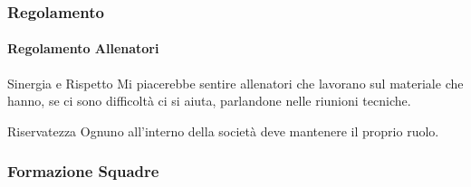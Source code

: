 \documentclass{beamer}
\begin{document}
\begin{frame}
\frametitle{Regolamento}
\framesubtitle{Regolamento Allenatori}
\begin{block}{Sinergia e Rispetto}
Mi piacerebbe sentire allenatori che lavorano sul materiale che hanno, se ci sono difficoltà ci si aiuta, parlandone nelle riunioni tecniche.
\end{block}
\pause
\begin{alertblock}{Riservatezza}
Ognuno all'interno della società deve mantenere il proprio ruolo. 
\end{alertblock}
\end{frame}


\begin{frame}
\frametitle{Formazione Squadre}

\end{frame}
\end{document}
